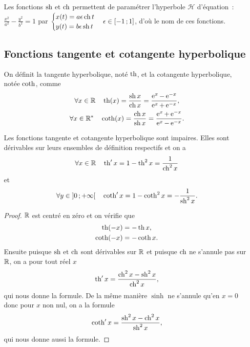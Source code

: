 %
Les fonctions $\operatorname{sh}$ et $\operatorname{ch}$ permettent de paramétrer l'hyperbole $\mathcal{H}$ d'équation~: $\frac{x^2}{a^2} - \frac{y^2}{b^2}=1$  par $\begin{cases} x(t)=a \epsilon \operatorname{ch} t \\ y(t)=b \epsilon \operatorname{sh} t\end{cases} \epsilon \in \left[ -1 \, ;  1 \right]$, d'où le nom de ces fonctions.
%
\subsection{Fonctions tangente et cotangente hyperbolique}
\label{subsec:chap1-tanhetcotanh}
\begin{defdef}
  On définit la tangente hyperbolique, noté $\operatorname{th}$, et la cotangente hyperbolique, notée $\operatorname{coth}$, comme
  \begin{gather}
    \forall x \in \mathbb{R} \quad \operatorname{th}(x)=\frac{\operatorname{sh} x}{\operatorname{ch} x}=\frac{\operatorname{e}^x - \operatorname{e}^{-x}}{\operatorname{e}^x+\operatorname{e}^{-x}}, \\
    \forall x \in \mathbb{R}^* \quad \operatorname{coth}(x)=\frac{\operatorname{ch} x}{\operatorname{sh} x}=\frac{\operatorname{e}^x + \operatorname{e}^{-x}}{\operatorname{e}^x-\operatorname{e}^{-x}}.
  \end{gather}
\end{defdef}
%
\begin{prop}
  Les fonctions tangente et cotangente hyperbolique sont impaires. Elles sont dérivables sur leurs ensembles de définition respectifs et on a
  \begin{equation}
    \forall x \in \mathbb{R} \quad \operatorname{th}' x = 1-\operatorname{th}^2 x = \frac{1}{\operatorname{ch}^2 x}
  \end{equation}
  et
  \begin{equation}
    \forall y \in \left] 0 \, ;  +\infty \right[ \quad \operatorname{coth}' x=1-\operatorname{coth}^2 x=-\frac{1}{\operatorname{sh}^2 x}.
  \end{equation}
\end{prop}
\begin{proof}
  $\mathbb{R}$ est centré en zéro et on vérifie que
  \begin{gather}
    \operatorname{th}(-x)=-\operatorname{th} x, \\
    \operatorname{coth}(-x) = -\operatorname{coth} x.
  \end{gather}
  Ensuite puisque $\operatorname{sh}$ et $\operatorname{ch}$ sont dérivables sur $\mathbb{R}$ et puisque $\operatorname{ch}$ ne s'annule pas sur $\mathbb{R}$, on a pour tout réel $x$
  \begin{equation}
    \operatorname{th}' x = \frac{\operatorname{ch}^2 x - \operatorname{sh}^2 x}{\operatorname{ch}^2 x},
  \end{equation}
  qui nous donne la formule. De la même manière $\sinh$ ne s'annule qu'en $x=0$ donc pour $x$ non nul, on a la formule
  \begin{equation}
    \operatorname{coth}' x = \frac{\operatorname{sh}^2 x - \operatorname{ch}^2 x}{\operatorname{sh}^2 x},
  \end{equation}
  qui nous donne aussi la formule.
\end{proof}
